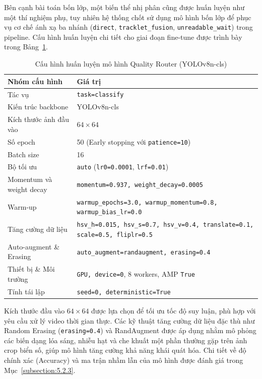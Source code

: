 \documentclass[../DoAn.tex]{subfiles}
\begin{document}
Bên cạnh bài toán bốn lớp, một biến thể nhị phân cũng được huấn luyện như một thí nghiệm phụ, tuy nhiên hệ thống chốt sử dụng mô hình bốn lớp để phục vụ cơ chế ánh xạ ba nhánh (\texttt{direct}, \texttt{tracklet\_fusion}, \texttt{unreadable\_wait}) trong pipeline. Cấu hình huấn luyện chi tiết cho giai đoạn fine-tune được trình bày trong Bảng~\ref{tab:qr_train_config}.

\begin{table}[htbp]
\centering
\caption{Cấu hình huấn luyện mô hình Quality Router (YOLOv8n-cls)}
\label{tab:qr_train_config}
\begin{tabularx}{\textwidth}{|l|X|}
\hline
\textbf{Nhóm cấu hình} & \textbf{Giá trị} \\
\hline
Tác vụ & \texttt{task=classify} \\
Kiến trúc backbone & YOLOv8n-cls \\
Kích thước ảnh đầu vào & $64 \times 64$ \\
Số epoch & 50 (Early stopping với \texttt{patience=10}) \\
Batch size & 16 \\
Bộ tối ưu & \texttt{auto} (\texttt{lr0=0.0001}, \texttt{lrf=0.01}) \\
Momentum và weight decay & \texttt{momentum=0.937, weight\_decay=0.0005} \\
Warm-up & \texttt{warmup\_epochs=3.0, warmup\_momentum=0.8, warmup\_bias\_lr=0.0} \\
Tăng cường dữ liệu & \texttt{hsv\_h=0.015, hsv\_s=0.7, hsv\_v=0.4, translate=0.1, scale=0.5, fliplr=0.5} \\
Auto-augment \& Erasing & \texttt{auto\_augment=randaugment, erasing=0.4} \\
Thiết bị \& Môi trường & \texttt{GPU, device=0}, 8 workers, AMP \texttt{True} \\
Tính tái lập & \texttt{seed=0, deterministic=True} \\
\hline
\end{tabularx}
\end{table}

Kích thước đầu vào $64 \times 64$ được lựa chọn để tối ưu tốc độ suy luận, phù hợp với yêu cầu xử lý video thời gian thực. Các kỹ thuật tăng cường dữ liệu đặc thù như Random Erasing (\texttt{erasing=0.4}) và RandAugment được áp dụng nhằm mô phỏng các biến dạng lóa sáng, nhiễu hạt và che khuất một phần thường gặp trên ảnh crop biển số, giúp mô hình tăng cường khả năng khái quát hóa. Chi tiết về độ chính xác (Accuracy) và ma trận nhầm lẫn của mô hình được đánh giá trong Mục~\ref{subsection:5.2.3}.
\end{document}
